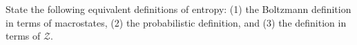 

\vspace*{\fill}
\centering

State the following equivalent definitions of entropy: (1) the Boltzmann definition in terms of macrostates, (2) the probabilistic definition, and (3) the definition in terms of $\mathcal{Z}$.

\centering
\vspace*{\fill}

